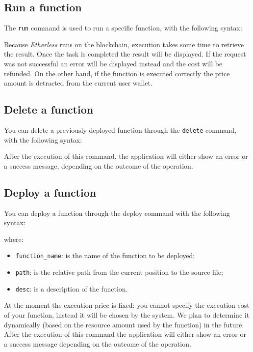 \subsection{Run a function}
The \texttt{run} command is used to run a specific function, with the following syntax: \\
\begin{center}
\end{center}
Because \textit{Etherless} runs on the blockchain, execution takes some time to retrieve the result. Once the task is completed the result will be displayed. If the request was not successful an error will be displayed instead and the cost will be refunded. On the other hand, if the function is executed correctly the price amount is detracted from the current user wallet.

\subsection{Delete a function}
You can delete a previously deployed function through the \texttt{delete} command, with the following syntax:
\begin{center}
\end{center}
After the execution of this command, the application will either show an error or a success message, depending on the outcome of the operation.

\subsection{Deploy a function}
You can deploy a function through the deploy command with the following syntax:
\begin{center}
\end{center}
\noindent where:
\begin{itemize}
	\item \texttt{function\_name}: is the name of the function to be deployed;
	\item \texttt{path}: is the relative path from the current position to the source file;
	\item \texttt{desc}: is a description of the function.
\end{itemize}
At the moment the execution price is fixed: you cannot specify the execution cost of your function, instead it will be chosen by the system. We plan to determine it dynamically (based on the resource amount used by the function) in the future. After the execution of this command the application will either show an error or a success message depending on the outcome of the operation.
